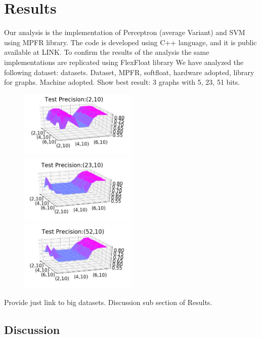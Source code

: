 \documentclass[sigplan,review,anonymous=false]{acmart}\settopmatter{printfolios=true,printccs=false,printacmref=false}
\begin{document}
\section{Results}
Our analysis is the implementation of Perceptron (average Variant) and SVM using MPFR\cite{MPFR} library. The code is developed using C++ language, and it is public available at LINK.
To confirm the results of the analysis the same implementations are replicated using FlexFloat library \cite{softfloat}
We have analyzed the following dataset: datasets.
Dataset, MPFR, softfloat, hardware adopted, library for graphs. 
Machine adopted.
Show best result: 3 graphs with 5, 23, 51 bits.
\begin{figure}[H]
	\includegraphics[width=0.5\textwidth]{210}
	\includegraphics[width=0.5\textwidth]{2310}
	\includegraphics[width=0.5\textwidth]{5210}
\end{figure}

Provide just link to big datasets. 
Discussion sub section of Results.
\subsection{Discussion}
\end{document}
